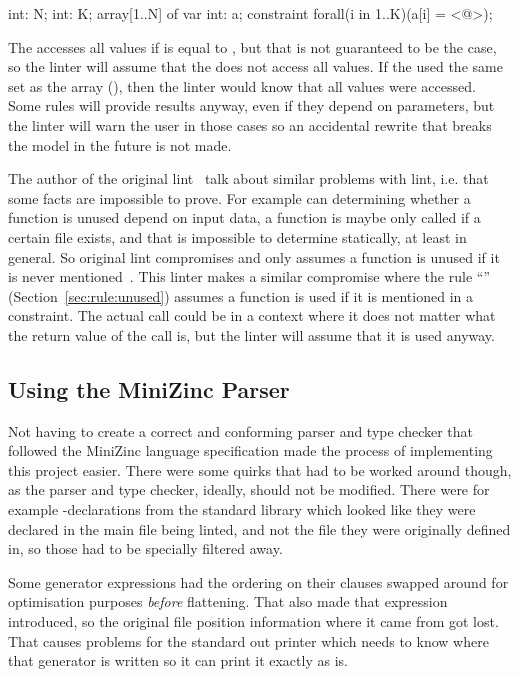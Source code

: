 \documentclass[a4paper,12pt]{article}
\newcommand{\ruleref}[1]{``\nameref{sec:rule:#1}'' (Section~\ref{sec:rule:#1})}
\begin{document}
\begin{mznnobreak}
int: N; int: K;
array[1..N] of var int: a;
constraint forall(i in 1..K)(a[i] = <@\dots@>);
\end{mznnobreak}

The  accesses all values if  is equal to , but that is not
guaranteed to be the case, so the linter will assume that the  does not access
all values. If the  used the same set as the array (), then the
linter would know that all values were accessed. Some rules will provide results anyway,
even if they depend on parameters, but the linter will warn the user in those cases so an
accidental rewrite that breaks the model in the future is not made.

The author of the original lint~\cite{lint} talk about similar problems with lint, i.e.\@
that some facts are impossible to prove. For example can determining whether a function is
unused depend on input data, a function is maybe only called if a certain file exists,
and that is impossible to determine statically, at least in general. So original lint
compromises and only assumes a function is unused if it is never mentioned~\cite{lint}.
This linter makes a similar compromise where the rule \ruleref{unused} assumes a function
is used if it is mentioned in a constraint. The actual call could be in a context where it
does not matter what the return value of the call is, but the linter will assume that it is used anyway.

\subsection{Using the MiniZinc Parser}
Not having to create a correct and conforming parser and type checker that followed the
MiniZinc language specification made the process of implementing this project easier.
There were some quirks that had to be worked around though, as the parser and type
checker, ideally, should not be modified. There were for example -declarations
from the standard library which looked like they were declared in the main file being
linted, and not the file they were originally defined in, so those had to be specially
filtered away.

Some generator expressions had the ordering on their  clauses swapped around for
optimisation purposes \emph{before} flattening. That also made that expression introduced,
so the original file position information where it came from got lost. That causes
problems for the standard out printer which needs to know where that generator is written
so it can print it exactly as is.
\end{document}
